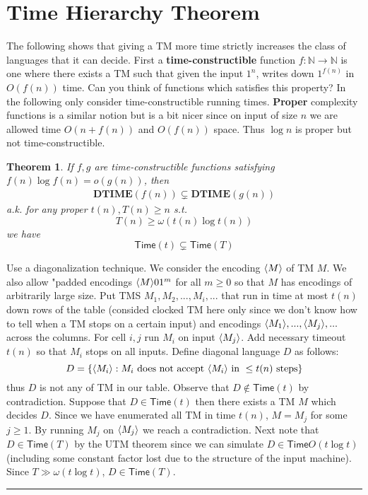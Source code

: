 \documentclass[twoside]{article}
\newcounter{lecnum}
\newtheorem{theorem}{Theorem}[lecnum]
\newenvironment{proof}{{\bf Proof:}}{\hfill\rule{2mm}{2mm}}
\def\N{\mathbb{N}}
\DeclarePairedDelimiter\anglebrac{\langle}{\rangle}
\begin{document}
\section{Time Hierarchy Theorem}
The following shows that giving a TM more time strictly increases the class of languages that it can decide. First a \textbf{time-constructible} function $f: \N \rightarrow \N$ is one where there exists a TM such that given the input $1^n$, writes down $1^{f(n)}$ in $O(f(n))$ time. Can you think of functions which satisfies this property? In the following only consider time-constructible running times. \textbf{Proper} complexity functions is a similar notion but is a bit nicer since on input of size $n$ we are allowed time $O(n + f(n))$ and $O(f(n))$ space. Thus $\log n$ is proper but not time-constructible. 

\begin{theorem}
If $f, g$ are time-constructible functions satisfying $f(n)\log f(n) = o(g(n))$, then 
\begin{align}
\mathbf{DTIME}(f(n)) \subsetneq \mathbf{DTIME}(g(n)) \label{DistinguishDTime}
\end{align}
a.k. for any proper $t(n), T(n) \geq n$ s.t. 
\[T(n) \geq \omega(t(n) \log t(n))\]
we have 
\[\mathsf{Time}(t) \subsetneq \mathsf{Time}(T)\]
\end{theorem}
\begin{proof}
Use a diagonalization technique. We consider the encoding $\anglebrac{M}$ of TM $M$. We also allow "padded encodings $\anglebrac{M}01^m$ for all $m \geq 0$ so that $M$ has encodings of arbitrarily large size. Put TMS $M_1, M_2, ..., M_i, ...$ that run in time at most $t(n)$ down rows of the table (consided clocked TM here only since we don't know how to tell when a TM stops on a certain input) and encodings $\anglebrac{M_1}, ..., \anglebrac{M_j}, ...$ across the columns. For cell $i, j$ run $M_i$ on input $\anglebrac{M_j}$. Add necessary timeout $t(n)$ so that $M_i$ stops on all inputs. Define diagonal language $D$ as follows: 
\[D = \{\anglebrac{M_i}: M_i \mbox{ does not accept } \anglebrac{M_i} \mbox{ in } \leq t(n) \mbox{ steps}\}\]
thus $D$ is not any of TM in our table. Observe that $D \notin \mathsf{Time}(t)$ by contradiction. Suppose that $D \in \mathsf{Time}(t)$ then there exists a TM $M$ which decides $D$. Since we have enumerated all TM in time $t(n)$, $M = M_j$ for some $j \geq 1$. By running $M_j$ on $\anglebrac{M_j}$ we reach a contradiction.  Next note that $D \in \mathsf{Time}(T)$ by the UTM theorem since we can simulate $D \in \mathsf{Time} O(t\log t)$ (including some constant factor lost due to the structure of the input machine). Since $T \gg \omega(t \log t)$, $D \in \mathsf{Time}(T)$.   
\end{proof}
\end{document}
